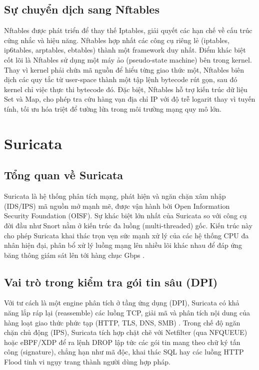 \documentclass[../DoAn.tex]{subfiles}
\begin{document}
\subsection{Sự chuyển dịch sang Nftables}
Nftables được phát triển để thay thế Iptables, giải quyết các hạn chế về cấu trúc cứng nhắc và hiệu năng. Nftables hợp nhất các công cụ riêng lẻ (iptables, ip6tables, arptables, ebtables) thành một framework duy nhất. Điểm khác biệt cốt lõi là Nftables sử dụng một máy ảo (pseudo-state machine) bên trong kernel. Thay vì kernel phải chứa mã nguồn để hiểu từng giao thức một, Nftables biên dịch các quy tắc từ user-space thành một tập lệnh bytecode rút gọn, sau đó kernel chỉ việc thực thi bytecode đó. Đặc biệt, Nftables hỗ trợ kiến trúc dữ liệu Set và Map, cho phép tra cứu hàng vạn địa chỉ IP với độ trễ logarit thay vì tuyến tính, tối ưu hóa triệt để tường lửa trong môi trường mạng quy mô lớn.

\section{Suricata}
\subsection{Tổng quan về Suricata}
Suricata là hệ thống phân tích mạng, phát hiện và ngăn chặn xâm nhập (IDS/IPS) mã nguồn mở mạnh mẽ, được vận hành bởi Open Information Security Foundation (OISF). Sự khác biệt lớn nhất của Suricata so với công cụ đời đầu như Snort nằm ở kiến trúc đa luồng (multi-threaded) gốc. Kiến trúc này cho phép Suricata khai thác trọn vẹn sức mạnh xử lý của các hệ thống CPU đa nhân hiện đại, phân bổ xử lý luồng mạng lên nhiều lõi khác nhau để đáp ứng băng thông giám sát lên tới hàng chục Gbps \cite{suricata_docs}.

\subsection{Vai trò trong kiểm tra gói tin sâu (DPI)}
Với tư cách là một engine phân tích ở tầng ứng dụng (DPI), Suricata có khả năng lắp ráp lại (reassemble) các luồng TCP, giải mã và phân tích nội dung của hàng loạt giao thức phức tạp (HTTP, TLS, DNS, SMB) \cite{suricata_docs}. Trong chế độ ngăn chặn chủ động (IPS), Suricata tích hợp chặt chẽ với Netfilter (qua NFQUEUE) hoặc eBPF/XDP để ra lệnh DROP lập tức các gói tin mang theo chữ ký tấn công (signature), chẳng hạn như mã độc, khai thác SQL hay các luồng HTTP Flood tinh vi ngụy trang thành người dùng hợp pháp.
\end{document}
